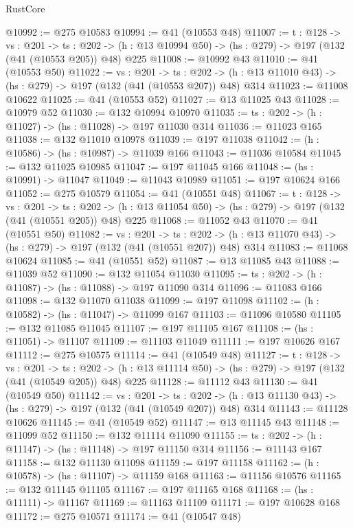\begin{lexlean}{RustCore}
\begin{coremodule}
@10992 := @275 @10583
@10994 := @41 (@10553 @48)
@11007 := {t : @128} ->
  {vs : @201} ->
  {ts : @202} -> (h : @13 @10994 @50) -> (hs : @279) -> @197 (@132 (@41 (@10553 @205)) @48) @225
@11008 := @10992 @43
@11010 := @41 (@10553 @50)
@11022 := {vs : @201} ->
  {ts : @202} -> (h : @13 @11010 @43) -> (hs : @279) -> @197 (@132 (@41 (@10553 @207)) @48) @314
@11023 := @11008 @10622
@11025 := @41 (@10553 @52)
@11027 := @13 @11025 @43
@11028 := @10979 @52
@11030 := @132 @10994 @10970
@11035 := {ts : @202} -> (h : @11027) -> (hs : @11028) -> @197 @11030 @314
@11036 := @11023 @165
@11038 := @132 @11010 @10978
@11039 := @197 @11038
@11042 := (h : @10586) -> (hs : @10987) -> @11039 @166
@11043 := @11036 @10584
@11045 := @132 @11025 @10985
@11047 := @197 @11045 @166
@11048 := (hs : @10991) -> @11047
@11049 := @11043 @10989
@11051 := @197 @10624 @166
@11052 := @275 @10579
@11054 := @41 (@10551 @48)
@11067 := {t : @128} ->
  {vs : @201} ->
  {ts : @202} -> (h : @13 @11054 @50) -> (hs : @279) -> @197 (@132 (@41 (@10551 @205)) @48) @225
@11068 := @11052 @43
@11070 := @41 (@10551 @50)
@11082 := {vs : @201} ->
  {ts : @202} -> (h : @13 @11070 @43) -> (hs : @279) -> @197 (@132 (@41 (@10551 @207)) @48) @314
@11083 := @11068 @10624
@11085 := @41 (@10551 @52)
@11087 := @13 @11085 @43
@11088 := @11039 @52
@11090 := @132 @11054 @11030
@11095 := {ts : @202} -> (h : @11087) -> (hs : @11088) -> @197 @11090 @314
@11096 := @11083 @166
@11098 := @132 @11070 @11038
@11099 := @197 @11098
@11102 := (h : @10582) -> (hs : @11047) -> @11099 @167
@11103 := @11096 @10580
@11105 := @132 @11085 @11045
@11107 := @197 @11105 @167
@11108 := (hs : @11051) -> @11107
@11109 := @11103 @11049
@11111 := @197 @10626 @167
@11112 := @275 @10575
@11114 := @41 (@10549 @48)
@11127 := {t : @128} ->
  {vs : @201} ->
  {ts : @202} -> (h : @13 @11114 @50) -> (hs : @279) -> @197 (@132 (@41 (@10549 @205)) @48) @225
@11128 := @11112 @43
@11130 := @41 (@10549 @50)
@11142 := {vs : @201} ->
  {ts : @202} -> (h : @13 @11130 @43) -> (hs : @279) -> @197 (@132 (@41 (@10549 @207)) @48) @314
@11143 := @11128 @10626
@11145 := @41 (@10549 @52)
@11147 := @13 @11145 @43
@11148 := @11099 @52
@11150 := @132 @11114 @11090
@11155 := {ts : @202} -> (h : @11147) -> (hs : @11148) -> @197 @11150 @314
@11156 := @11143 @167
@11158 := @132 @11130 @11098
@11159 := @197 @11158
@11162 := (h : @10578) -> (hs : @11107) -> @11159 @168
@11163 := @11156 @10576
@11165 := @132 @11145 @11105
@11167 := @197 @11165 @168
@11168 := (hs : @11111) -> @11167
@11169 := @11163 @11109
@11171 := @197 @10628 @168
@11172 := @275 @10571
@11174 := @41 (@10547 @48)

\end{coremodule}
\end{lexlean}
